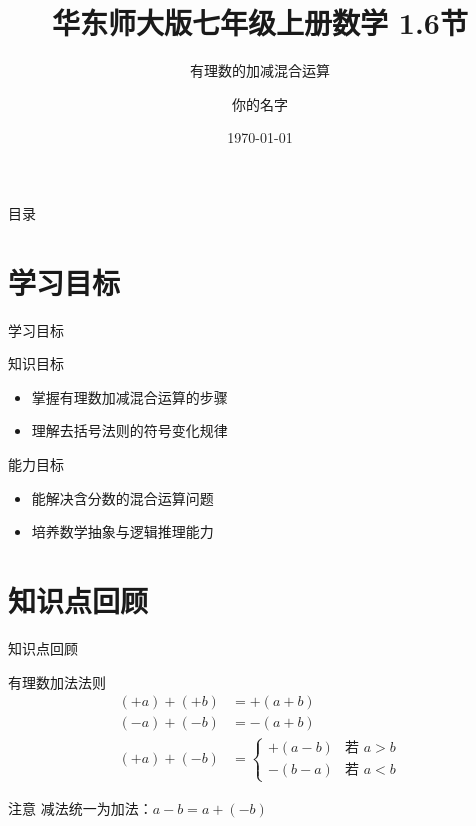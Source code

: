 \documentclass{ctexbeamer}
\title{华东师大版七年级上册数学 1.6节}
\subtitle{有理数的加减混合运算} %
\author{你的名字}
\date{\today}
\begin{document}
\begin{frame}{目录}
    \tableofcontents
\end{frame}

\section{学习目标}
\begin{frame}{学习目标}
    \begin{block}{知识目标}
        \begin{itemize}
            \item 掌握有理数加减混合运算的步骤
            \item 理解去括号法则的符号变化规律
        \end{itemize}
    \end{block}

    \begin{block}{能力目标}
        \begin{itemize}
            \item 能解决含分数的混合运算问题
            \item 培养数学抽象与逻辑推理能力
        \end{itemize}
    \end{block}
\end{frame}

\section{知识点回顾}
\begin{frame}{知识点回顾}
    \begin{exampleblock}{有理数加法法则}
        \begin{align*}
            (+a) + (+b) &= +(a+b) \\
            (-a) + (-b) &= -(a+b) \\
            (+a) + (-b) &= 
            \begin{cases}
                +(a-b) & \text{若 } a > b \\
                -(b-a) & \text{若 } a < b
            \end{cases}
        \end{align*}
    \end{exampleblock}

    \begin{alertblock}{注意}
        减法统一为加法：$a - b = a + (-b)$
    \end{alertblock}
\end{frame}
\end{document}
